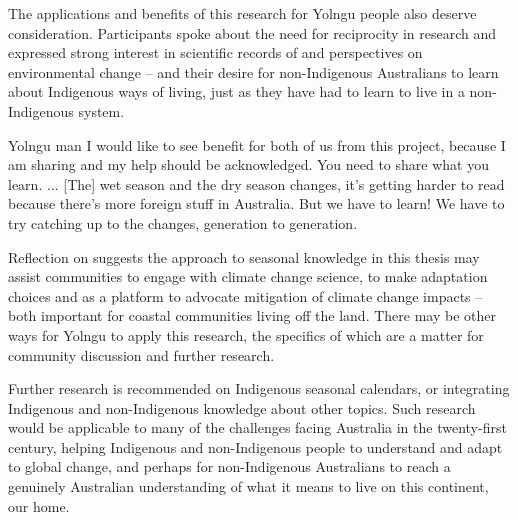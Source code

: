 The applications and benefits of this research for Yolngu people also deserve
consideration.  Participants spoke about the need for reciprocity in research
and expressed strong interest in scientific records of and perspectives on
environmental change -- and their desire for non-Indigenous Australians to
learn about Indigenous ways of living, just as they have had to learn to
live in a non-Indigenous system.
\begin{pquote}{Yolngu man}
    I would like to see benefit for both of us from this project, because I am
    sharing and my help should be acknowledged.  You need to share what you learn. ...
    [The] wet season and the dry season changes, it's getting harder to read
    because there's more foreign stuff in Australia.  But we have to learn!
    We have to try catching up to the changes, generation to generation.
\end{pquote}
Reflection on \citet{petheram2010} suggests the approach to seasonal knowledge in this thesis
may assist communities to engage with climate change science, to make
adaptation choices and as a platform to advocate mitigation of climate change impacts -- both
important for coastal communities living off the land.  There may be other
ways for Yolngu to apply this research, the specifics of which are a matter for
community discussion and further research.


Further research is recommended on Indigenous seasonal calendars, or
integrating Indigenous and non-Indigenous knowledge about other topics.  Such
research would be applicable to many of the challenges facing
Australia in the twenty-first century, helping Indigenous and non-Indigenous
people to understand and adapt to global change, and perhaps for non-Indigenous
Australians to reach a genuinely Australian understanding of what it means to
live on this continent, our home.

